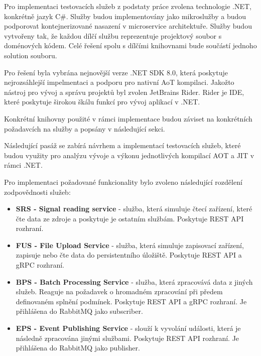 
Pro implementaci testovacích služeb z podstaty práce zvolena technologie .NET, konkrétně jazyk C\#. Služby budou implementovány jako mikroslužby a budou podporovat kontejnerizované nasazení v microservice architektuře. Služby budou vytvořeny tak, že každou dílčí službu reprezentuje projektový soubor s doménových kódem. Celé řešení spolu s dílčími knihovnami bude součástí jednoho solution souboru.

Pro řešení byla vybrána nejnovější verze .NET SDK 8.0, která poskytuje nejrozsáhlejší impelmentaci a podporu pro nativní AoT kompilaci. Jakožto nástroj pro vývoj a správu projektů byl zvolen JetBrains Rider. Rider je IDE, které poskytuje širokou škálu funkcí pro vývoj aplikací v .NET.

Konkrétní knihovny použité v rámci implementace budou záviset na konkrétních požadavcích na služby a popsány v následující sekci.


Následující pasáž se zabírá návrhem a implementací testovacích služeb, které budou využity pro analýzu vývoje a výkonu jednotlivých kompilací AOT a JIT v rámci .NET.


Pro implementaci požadované funkcionality bylo zvoleno následující rozdělení zodpovědnosti služeb:

\begin{itemize}
    \item \textbf{SRS - Signal reading service} - služba, která simuluje čtecí zařízení, které čte data ze zdroje a poskytuje je ostatním službám. Poskytuje REST API rozhraní.
    \item \textbf{FUS - File Upload Service} - služba, která simuluje zapisovací zařízení, zapisuje nebo čte data do persistentního úložiště. Poskytuje REST API a gRPC rozhraní.
    \item \textbf{BPS - Batch Processing Service} - služba, která zpracovává data z jiných služeb. Reaguje na požadavek o hromadném zpracování při předem definovaném splnění podmínek. Poskytuje REST API a gRPC rozhraní. Je přihlášena do RabbitMQ jako subscriber.
    \item \textbf{EPS - Event Publishing Service} - slouží k vyvolání události, která je následně zpracována jinými službami. Poskytuje REST API rozhraní. Je přihlášena do RabbitMQ jako publisher.
\end{itemize}

